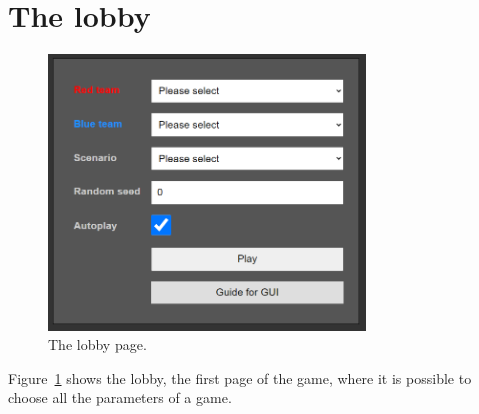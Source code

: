 \documentclass[a4paper]{article}
\begin{document}
	
	\section{The lobby}

	\begin{figure}[ht!]
		\centering
		\includegraphics[width=0.75\textwidth]{lobby.png}
		\caption{The lobby page.}
		\label{lobby}
	\end{figure}

	Figure~\ref{lobby} shows the lobby, the first page of the game, where it is possible to choose all the parameters of a game.
\end{document}

